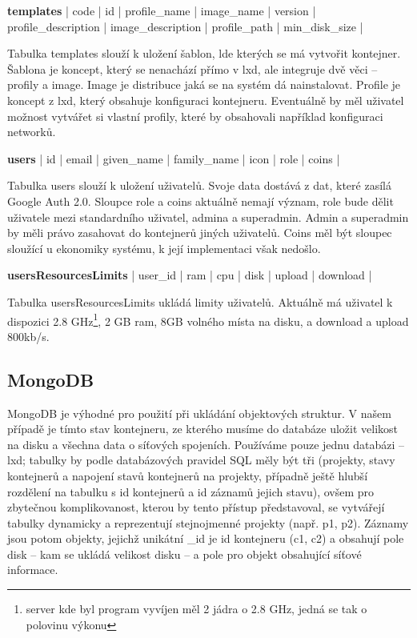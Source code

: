 \documentclass[a4paper,oneside,12pt]{report}
\begin{document}
\vspace{0.3cm}
\noindent
\textbf{templates} | code | id | profile\_name | image\_name | version | profile\_description | image\_description | profile\_path | min\_disk\_size |

Tabulka templates slouží k uložení šablon, lde kterých se má vytvořit kontejner.
Šablona je koncept, který se nenachází přímo v lxd, ale integruje dvě věci -- profily a image.
Image je distribuce jaká se na systém dá nainstalovat.
Profile je koncept z lxd, který obsahuje konfiguraci kontejneru.
Eventuálně by měl uživatel možnost vytvářet si vlastní profily, které by obsahovali například konfiguraci networků.

\vspace{0.3cm}
\noindent
\textbf{users} | id | email | given\_name | family\_name | icon | role | coins |

Tabulka users slouží k uložení uživatelů.
Svoje data dostává z dat, které zasílá Google Auth 2.0.
Sloupce role a coins aktuálně nemají význam, role bude dělit uživatele mezi standardního uživatel, admina a superadmin.
Admin a superadmin by měli právo zasahovat do kontejnerů jiných uživatelů.
Coins měl být sloupec sloužící u ekonomiky systému, k její implementaci však nedošlo.


\vspace{0.3cm}
\noindent
\textbf{usersResourcesLimits} | user\_id | ram | cpu | disk | upload | download |

Tabulka usersResourcesLimits ukládá limity uživatelů.
Aktuálně má uživatel k dispozici 2.8 GHz\footnote{server kde byl program vyvíjen měl 2 jádra o 2.8 GHz, jedná se tak o polovinu výkonu}, 2 GB ram, 8GB volného místa na disku, a download a upload 800kb/s.

\subsection{MongoDB}

MongoDB je výhodné pro použití při ukládání objektových struktur.
V našem případě je tímto stav kontejneru, ze kterého musíme do databáze uložit velikost na disku a všechna data o síťových spojeních.
Používáme pouze jednu databázi – lxd; tabulky by podle databázových pravidel SQL měly být tři (projekty, stavy kontejnerů a napojení stavů kontejnerů na projekty, případně ještě hlubší rozdělení na tabulku s id kontejnerů a id záznamů jejich stavu), ovšem pro zbytečnou komplikovanost, kterou by tento přístup představoval, se vytvářejí tabulky dynamicky a reprezentují stejnojmenné projekty (např. p1, p2).
Záznamy jsou potom objekty, jejichž unikátní \_id je id kontejneru (c1, c2) a obsahují pole disk -- kam se ukládá velikost disku – a pole pro objekt obsahující síťové informace.
\end{document}
